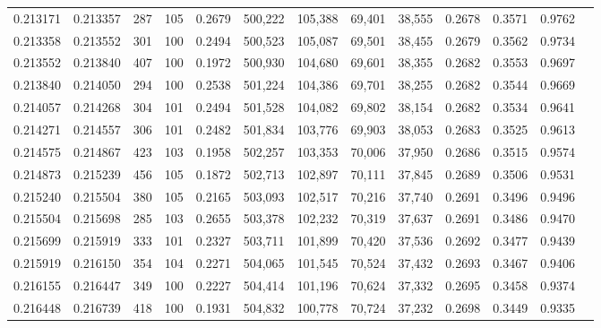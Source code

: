 \begin{tabular}{rrrrrrrrrrrrr}
0.213171 & 0.213357 &   287 & 105 &                                     0.2679 & 500,222 & 105,388 &  69,401 &  38,555 & 0.2678 & 0.3571 & 0.9762 \\
0.213358 & 0.213552 &   301 & 100 &                                     0.2494 & 500,523 & 105,087 &  69,501 &  38,455 & 0.2679 & 0.3562 & 0.9734 \\
0.213552 & 0.213840 &   407 & 100 &                                     0.1972 & 500,930 & 104,680 &  69,601 &  38,355 & 0.2682 & 0.3553 & 0.9697 \\
0.213840 & 0.214050 &   294 & 100 &                                     0.2538 & 501,224 & 104,386 &  69,701 &  38,255 & 0.2682 & 0.3544 & 0.9669 \\
0.214057 & 0.214268 &   304 & 101 &                                     0.2494 & 501,528 & 104,082 &  69,802 &  38,154 & 0.2682 & 0.3534 & 0.9641 \\
0.214271 & 0.214557 &   306 & 101 &                                     0.2482 & 501,834 & 103,776 &  69,903 &  38,053 & 0.2683 & 0.3525 & 0.9613 \\
0.214575 & 0.214867 &   423 & 103 &                                     0.1958 & 502,257 & 103,353 &  70,006 &  37,950 & 0.2686 & 0.3515 & 0.9574 \\
0.214873 & 0.215239 &   456 & 105 &                                     0.1872 & 502,713 & 102,897 &  70,111 &  37,845 & 0.2689 & 0.3506 & 0.9531 \\
0.215240 & 0.215504 &   380 & 105 &                                     0.2165 & 503,093 & 102,517 &  70,216 &  37,740 & 0.2691 & 0.3496 & 0.9496 \\
0.215504 & 0.215698 &   285 & 103 &                                     0.2655 & 503,378 & 102,232 &  70,319 &  37,637 & 0.2691 & 0.3486 & 0.9470 \\
0.215699 & 0.215919 &   333 & 101 &                                     0.2327 & 503,711 & 101,899 &  70,420 &  37,536 & 0.2692 & 0.3477 & 0.9439 \\
0.215919 & 0.216150 &   354 & 104 &                                     0.2271 & 504,065 & 101,545 &  70,524 &  37,432 & 0.2693 & 0.3467 & 0.9406 \\
0.216155 & 0.216447 &   349 & 100 &                                     0.2227 & 504,414 & 101,196 &  70,624 &  37,332 & 0.2695 & 0.3458 & 0.9374 \\
0.216448 & 0.216739 &   418 & 100 &                                     0.1931 & 504,832 & 100,778 &  70,724 &  37,232 & 0.2698 & 0.3449 & 0.9335 \\

\end{tabular}
